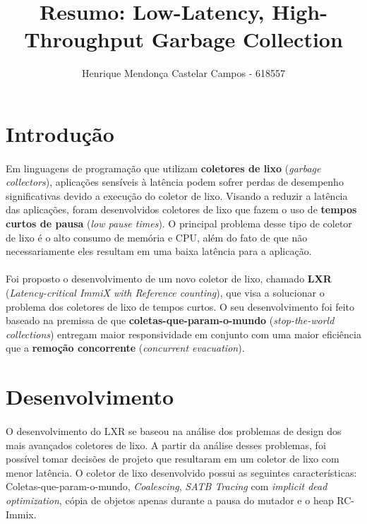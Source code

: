 \documentclass[12pt]{article}
\title{Resumo: Low-Latency, High-Throughput Garbage Collection}
\author{Henrique Mendonça Castelar Campos - 618557}
\begin{document}
 

\maketitle

\section{Introdução}

\paragraph{}Em linguagens de programação que utilizam \textbf{coletores de lixo} (\textit{garbage collectors}), aplicações sensíveis à latência podem sofrer perdas de desempenho significativas devido a execução do coletor de lixo. Visando a reduzir a latência das aplicações, foram desenvolvidos coletores de lixo que fazem o uso de \textbf{tempos curtos de pausa} (\textit{low pause times}). O principal problema desse tipo de coletor de lixo é o alto consumo de memória e CPU, além do fato de que não necessariamente eles resultam em uma baixa latência para a aplicação.

\paragraph{}Foi proposto o desenvolvimento de um novo coletor de lixo, chamado \textbf{LXR} (\textit{Latency-critical ImmiX with Reference counting}), que visa a solucionar o problema dos coletores de lixo de tempos curtos. O seu desenvolvimento foi feito baseado na premissa de que \textbf{coletas-que-param-o-mundo} (\textit{stop-the-world collections}) entregam maior responsividade em conjunto com uma maior eficiência que a \textbf{remoção concorrente} (\textit{concurrent evacuation}).

\section{Desenvolvimento}

\paragraph{}O desenvolvimento do LXR se baseou na análise dos problemas de design dos mais avançados coletores de lixo. A partir da análise desses problemas, foi possível tomar decisões de projeto que resultaram em um coletor de lixo com menor latência. O coletor de lixo desenvolvido possui as seguintes características: Coletas-que-param-o-mundo, \textit{Coalescing}, \textit{SATB Tracing} com \textit{implicit dead optimization}, cópia de objetos apenas durante a pausa do mutador e o heap RC-Immix.
\end{document}
